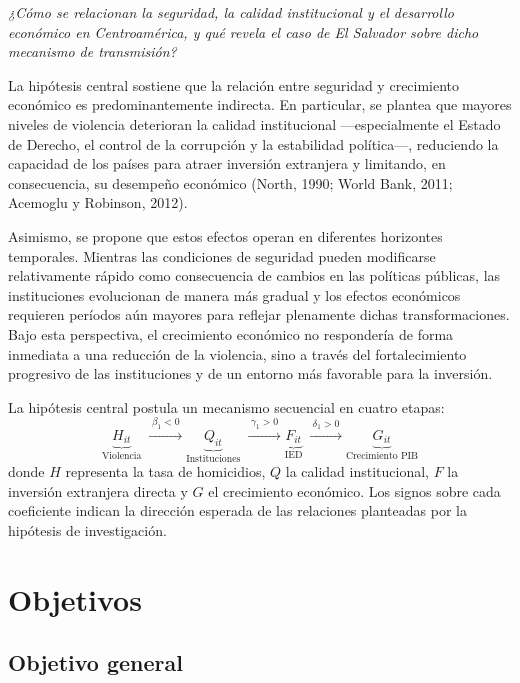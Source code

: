 \documentclass[11pt,a4paper]{article}
\begin{document}
\begin{center}
\textit{¿Cómo se relacionan la seguridad, la calidad institucional y el desarrollo económico en Centroamérica, y qué revela el caso de El Salvador sobre dicho mecanismo de transmisión?}
\end{center}

La hipótesis central sostiene que la relación entre seguridad y crecimiento económico es predominantemente indirecta. En particular, se plantea que mayores niveles de violencia deterioran la calidad institucional ---especialmente el Estado de Derecho, el control de la corrupción y la estabilidad política---, reduciendo la capacidad de los países para atraer inversión extranjera y limitando, en consecuencia, su desempeño económico (North, 1990; World Bank, 2011; Acemoglu y Robinson, 2012).

Asimismo, se propone que estos efectos operan en diferentes horizontes temporales. Mientras las condiciones de seguridad pueden modificarse relativamente rápido como consecuencia de cambios en las políticas públicas, las instituciones evolucionan de manera más gradual y los efectos económicos requieren períodos aún mayores para reflejar plenamente dichas transformaciones. Bajo esta perspectiva, el crecimiento económico no respondería de forma inmediata a una reducción de la violencia, sino a través del fortalecimiento progresivo de las instituciones y de un entorno más favorable para la inversión.

La hipótesis central postula un mecanismo secuencial en cuatro etapas:
\[
\underbrace{H_{it}}_{\text{Violencia}}
\;\xrightarrow{\;\beta_1 < 0\;}
\underbrace{Q_{it}}_{\text{Instituciones}}
\;\xrightarrow{\;\gamma_1 > 0\;}
\underbrace{F_{it}}_{\text{IED}}
\;\xrightarrow{\;\delta_1 > 0\;}
\underbrace{G_{it}}_{\text{Crecimiento PIB}}
\]
donde $H$ representa la tasa de homicidios, $Q$ la calidad institucional, $F$ la inversión extranjera directa y $G$ el crecimiento económico. Los signos sobre cada coeficiente indican la dirección esperada de las relaciones planteadas por la hipótesis de investigación.


\section*{Objetivos}

\subsection*{Objetivo general}
\end{document}
